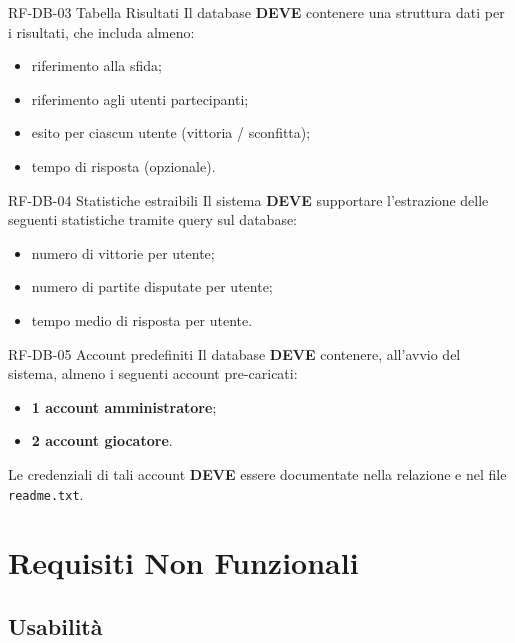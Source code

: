 \documentclass[12pt, a4paper]{article}
\newcommand{\mustshall}{\textbf{DEVE}}
\newcommand{\code}[1]{\texttt{#1}}
\begin{document}
\begin{reqbox}{RF-DB-03 \quad Tabella Risultati \quad [MUST]}
Il database \mustshall{} contenere una struttura dati per i risultati, che includa almeno:
\begin{itemize}
    \item riferimento alla sfida;
    \item riferimento agli utenti partecipanti;
    \item esito per ciascun utente (vittoria / sconfitta);
    \item tempo di risposta (opzionale).
\end{itemize}
\end{reqbox}

\begin{reqbox}{RF-DB-04 \quad Statistiche estraibili \quad [MUST]}
Il sistema \mustshall{} supportare l'estrazione delle seguenti statistiche tramite query sul database:
\begin{itemize}
    \item numero di vittorie per utente;
    \item numero di partite disputate per utente;
    \item tempo medio di risposta per utente.
\end{itemize}
\end{reqbox}

\begin{reqbox}{RF-DB-05 \quad Account predefiniti \quad [MUST]}
Il database \mustshall{} contenere, all'avvio del sistema, almeno i seguenti account pre-caricati:
\begin{itemize}
    \item \textbf{1 account amministratore};
    \item \textbf{2 account giocatore}.
\end{itemize}
Le credenziali di tali account \mustshall{} essere documentate nella relazione e nel file \code{readme.txt}.
\end{reqbox}

\newpage
\section{Requisiti Non Funzionali}

\subsection{Usabilità}
\end{document}
